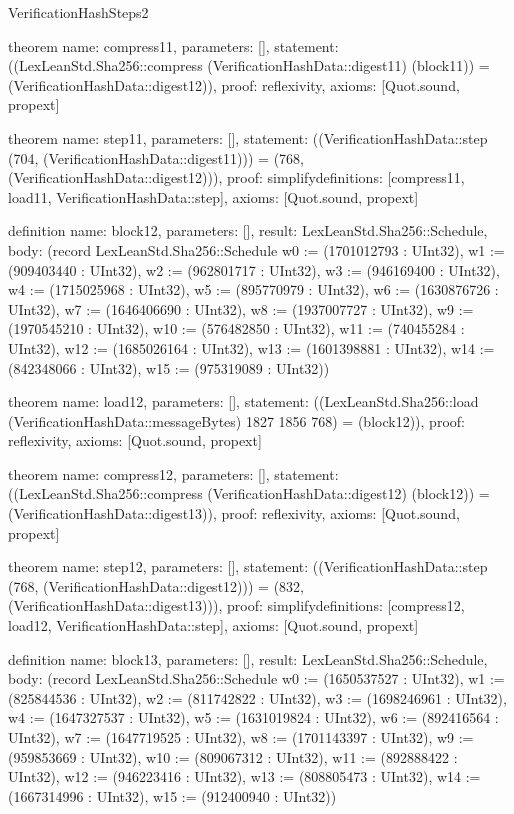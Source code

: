 \begin{lexlean}{VerificationHashSteps2}
\begin{semanticmodule}
theorem{
  name: compress11,
  parameters: [],
  statement: ((LexLeanStd.Sha256::compress (VerificationHashData::digest11) (block11)) = (VerificationHashData::digest12)),
  proof: reflexivity{},
  axioms: [Quot.sound, propext]
}

theorem{
  name: step11,
  parameters: [],
  statement: ((VerificationHashData::step (704, (VerificationHashData::digest11))) = (768, (VerificationHashData::digest12))),
  proof: simplify{definitions: [compress11, load11, VerificationHashData::step]},
  axioms: [Quot.sound, propext]
}

definition{
  name: block12,
  parameters: [],
  result: LexLeanStd.Sha256::Schedule,
  body: (record LexLeanStd.Sha256::Schedule {w0 := (1701012793 : UInt32), w1 := (909403440 : UInt32), w2 := (962801717 : UInt32), w3 := (946169400 : UInt32), w4 := (1715025968 : UInt32), w5 := (895770979 : UInt32), w6 := (1630876726 : UInt32), w7 := (1646406690 : UInt32), w8 := (1937007727 : UInt32), w9 := (1970545210 : UInt32), w10 := (576482850 : UInt32), w11 := (740455284 : UInt32), w12 := (1685026164 : UInt32), w13 := (1601398881 : UInt32), w14 := (842348066 : UInt32), w15 := (975319089 : UInt32)})
}

theorem{
  name: load12,
  parameters: [],
  statement: ((LexLeanStd.Sha256::load (VerificationHashData::messageBytes) 1827 1856 768) = (block12)),
  proof: reflexivity{},
  axioms: [Quot.sound, propext]
}

theorem{
  name: compress12,
  parameters: [],
  statement: ((LexLeanStd.Sha256::compress (VerificationHashData::digest12) (block12)) = (VerificationHashData::digest13)),
  proof: reflexivity{},
  axioms: [Quot.sound, propext]
}

theorem{
  name: step12,
  parameters: [],
  statement: ((VerificationHashData::step (768, (VerificationHashData::digest12))) = (832, (VerificationHashData::digest13))),
  proof: simplify{definitions: [compress12, load12, VerificationHashData::step]},
  axioms: [Quot.sound, propext]
}

definition{
  name: block13,
  parameters: [],
  result: LexLeanStd.Sha256::Schedule,
  body: (record LexLeanStd.Sha256::Schedule {w0 := (1650537527 : UInt32), w1 := (825844536 : UInt32), w2 := (811742822 : UInt32), w3 := (1698246961 : UInt32), w4 := (1647327537 : UInt32), w5 := (1631019824 : UInt32), w6 := (892416564 : UInt32), w7 := (1647719525 : UInt32), w8 := (1701143397 : UInt32), w9 := (959853669 : UInt32), w10 := (809067312 : UInt32), w11 := (892888422 : UInt32), w12 := (946223416 : UInt32), w13 := (808805473 : UInt32), w14 := (1667314996 : UInt32), w15 := (912400940 : UInt32)})
}


\end{semanticmodule}
\end{lexlean}

